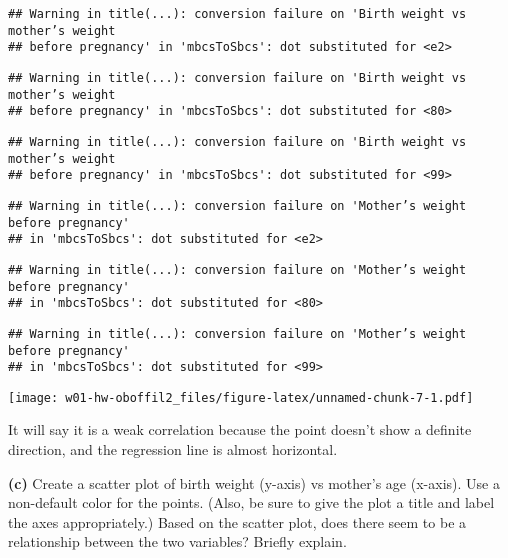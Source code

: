 \documentclass[]{article}
\newenvironment{Shaded}{\begin{snugshade}}{\end{snugshade}}
\newcommand{\DataTypeTok}[1]{\textcolor[rgb]{0.13,0.29,0.53}{#1}}
\newcommand{\KeywordTok}[1]{\textcolor[rgb]{0.13,0.29,0.53}{\textbf{#1}}}
\newcommand{\NormalTok}[1]{#1}
\newcommand{\OperatorTok}[1]{\textcolor[rgb]{0.81,0.36,0.00}{\textbf{#1}}}
\newcommand{\StringTok}[1]{\textcolor[rgb]{0.31,0.60,0.02}{#1}}
\begin{document}
\begin{verbatim}
## Warning in title(...): conversion failure on 'Birth weight vs mother’s weight
## before pregnancy' in 'mbcsToSbcs': dot substituted for <e2>
\end{verbatim}

\begin{verbatim}
## Warning in title(...): conversion failure on 'Birth weight vs mother’s weight
## before pregnancy' in 'mbcsToSbcs': dot substituted for <80>
\end{verbatim}

\begin{verbatim}
## Warning in title(...): conversion failure on 'Birth weight vs mother’s weight
## before pregnancy' in 'mbcsToSbcs': dot substituted for <99>
\end{verbatim}

\begin{verbatim}
## Warning in title(...): conversion failure on 'Mother’s weight before pregnancy'
## in 'mbcsToSbcs': dot substituted for <e2>
\end{verbatim}

\begin{verbatim}
## Warning in title(...): conversion failure on 'Mother’s weight before pregnancy'
## in 'mbcsToSbcs': dot substituted for <80>
\end{verbatim}

\begin{verbatim}
## Warning in title(...): conversion failure on 'Mother’s weight before pregnancy'
## in 'mbcsToSbcs': dot substituted for <99>
\end{verbatim}

\begin{Shaded}
\end{Shaded}

\texttt{[image: w01-hw-oboffil2\_files/figure-latex/unnamed-chunk-7-1.pdf]}

It will say it is a weak correlation because the point doesn't show a
definite direction, and the regression line is almost horizontal.

\textbf{(c)} Create a scatter plot of birth weight (y-axis) vs mother's
age (x-axis). Use a non-default color for the points. (Also, be sure to
give the plot a title and label the axes appropriately.) Based on the
scatter plot, does there seem to be a relationship between the two
variables? Briefly explain.
\end{document}
